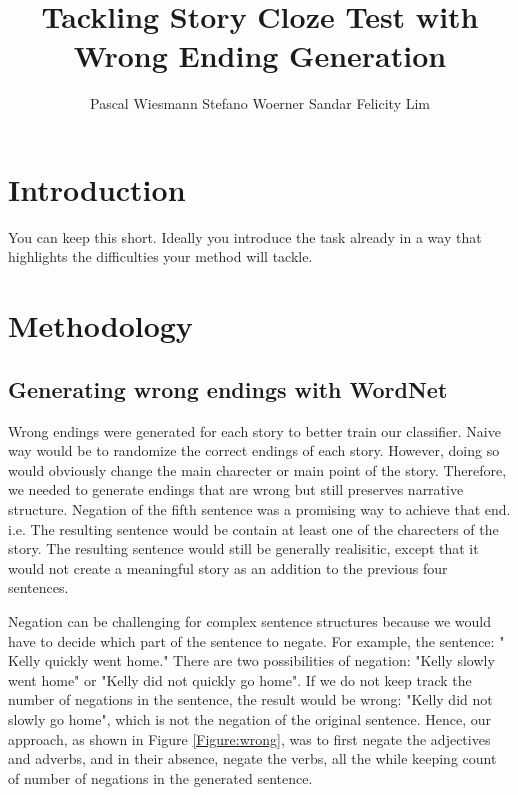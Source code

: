 \documentclass{article}
\title{Tackling Story Cloze Test with Wrong Ending Generation}
\author{Pascal Wiesmann \qquad Stefano Woerner \qquad Sandar Felicity Lim}
\begin{document}

\maketitle


\section{Introduction}
You can keep this short. Ideally you introduce the task already in a way that highlights the difficulties  your method will tackle.

\section{Methodology}
\subsection{Generating wrong endings with WordNet}
Wrong endings were generated for each story to better train our classifier. Naive way would be to randomize the correct endings of each story. However, doing so would obviously change the main charecter or main point of the story. Therefore, we needed to generate endings that are wrong but still preserves narrative structure. Negation of the fifth sentence was a promising way to achieve that end. i.e. The resulting sentence would be contain at least one of the charecters of the story. The resulting sentence would still be generally realisitic, except that it would not create a meaningful story as an addition to the previous four sentences.


Negation can be challenging for complex sentence structures because we would have to decide which part of the sentence to negate. For example, the sentence: "
Kelly quickly went home." There are two possibilities of negation: "Kelly slowly went home" or "Kelly did not quickly go home". If we do not keep track the number of negations in the sentence, the result would be wrong: "Kelly did not slowly go home", which is not the negation of the original sentence. Hence, our approach, as shown in  Figure \ref{Figure:wrong}, was to first negate the adjectives and adverbs, and in their absence, negate the verbs, all the while keeping count of number of negations in the generated sentence.
\end{document}
